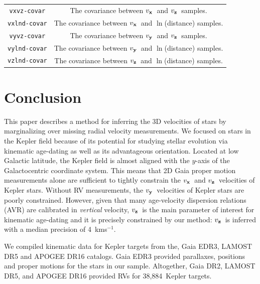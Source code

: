 \documentclass[]{aastex631}
\newcommand{\vx}{$v_{\bf x}$}
\newcommand{\vy}{$v_{\bf y}$}
\newcommand{\vz}{$v_{\bf z}$}
\newcommand{\vzprecision}{4}
\newcommand{\nrv}{38,884}
\begin{document}
\begin{table}[h!]
\begin{center}
\begin{tabular}{cc}
    {\tt vxvz-covar} & The covariance between \vx\ and \vz\ samples. \\
    {\tt vxlnd-covar} & The covariance between \vx\ and $\ln$(distance)
    samples. \\
    {\tt vyvz-covar} & The covariance between \vy\ and \vz\ samples. \\
    {\tt vylnd-covar} & The covariance between \vy\ and $\ln$(distance)
    samples. \\
    {\tt vzlnd-covar} & The covariance between \vz\ and $\ln$(distance)
    samples. \\
\end{tabular}
\end{center}
\end{table}

\section{Conclusion}

This paper describes a method for inferring the 3D velocities of stars by
marginalizing over missing radial velocity measurements.
We focused on stars in the Kepler field because of its potential for studying
stellar evolution via kinematic age-dating as well as its advantageous
orientation.
Located at low Galactic latitude, the Kepler field is almost aligned with the
$y$-axis of the Galactocentric coordinate system.
This means that 2D Gaia proper motion measurements alone are sufficient to
tightly constrain the \vx\ and \vz\ velocities of Kepler stars.
Without RV measurements, the \vy\ velocities  of Kepler stars are
poorly constrained.
However, given that many age-velocity dispersion relations (AVR) are
calibrated in {\it vertical} velocity, \vz\ is the main parameter of interest
for kinematic age-dating and it is precisely constrained by our method: \vz\
is inferred with a median precision of \vzprecision\ kms$^{-1}$.

We compiled kinematic data for Kepler targets from the, Gaia EDR3, LAMOST DR5
and APOGEE DR16 catalogs.
Gaia EDR3 provided parallaxes, positions and proper motions for the stars in
our sample.
Altogether, Gaia DR2, LAMOST DR5, and APOGEE DR16 provided RVs for \nrv\
Kepler targets.
\end{document}

